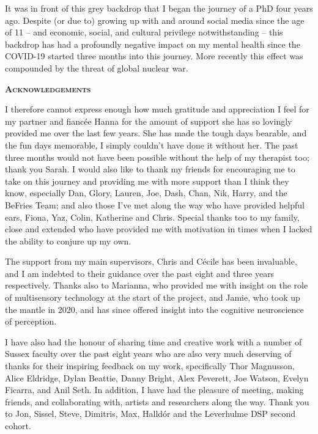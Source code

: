 It was in front of this grey backdrop that I began the journey of a PhD four years ago. Despite (or due to) growing up with and around social media since the age of 11 -- and economic, social, and cultural privilege notwithstanding -- this backdrop has had a profoundly negative impact on my mental health since the COVID-19 started three months into this journey. More recently this effect was compounded by the threat of global nuclear war.
\clearpage

{}
\begin{flushleft}
	\Huge \textsc{\textbf{Acknowledgements}}
	
\end{flushleft}

\noindent I therefore cannot express enough how much gratitude and appreciation I feel for my partner and fiancée Hanna for the amount of support she has so lovingly provided me over the last few years. She has made the tough days bearable, and the fun days memorable, I simply couldn't have done it without her. The past three months would not have been possible without the help of my therapist too; thank you Sarah. I would also like to thank my friends for encouraging me to take on this journey and providing me with more support than I think they know, especially Dan, Glory, Lauren, Joe, Dash, Chan, Nik, Harry, and the BeFries Team; and also those I've met along the way who have provided helpful ears, Fiona, Yaz, Colin, Katherine and Chris. Special thanks too to my family, close and extended who have provided me with motivation in times when I lacked the ability to conjure up my own.

The support from my main supervisors, Chris and C\'ecile has been invaluable, and I am indebted to their guidance over the past eight and three years respectively. Thanks also to Marianna, who provided me with insight on the role of multisensory technology at the start of the project, and Jamie, who took up the mantle in 2020, and has since offered insight into the cognitive neuroscience of perception.

I have also had the honour of sharing time and creative work with a number of Sussex faculty over the past eight years who are also very much deserving of thanks for their inspiring feedback on my work, specifically Thor Magnusson, Alice Eldridge, Dylan Beattie, Danny Bright, Alex Peverett, Joe Watson, Evelyn Ficarra, and Anil Seth. In addition, I have had the pleasure of meeting, making friends, and collaborating with, artists and researchers along the way. Thank you to Jon, Sissel, Steve, Dimitris, Max, Halld\'or and the Leverhulme DSP second cohort.

